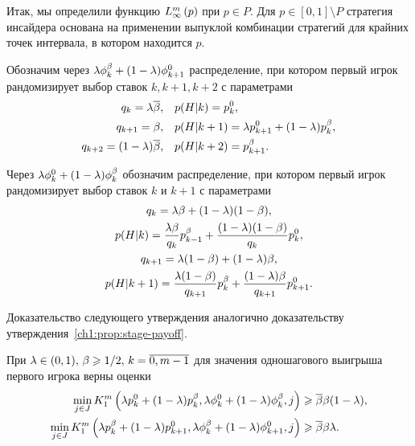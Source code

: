 {Итак, мы определили функцию $\lowerBound{p}$ при $p \in P$.
Для $p \in [0, 1] \setminus P$ стратегия инсайдера основана на применении выпуклой комбинации стратегий для крайних точек интервала, в котором находится $p$.

Обозначим через $\lambda\fOdd[k] + (1-\lambda)\fEven[k+1]$ распределение, при котором первый игрок рандомизирует выбор ставок $k, k+1, k+2$ с параметрами
\begin{align*}
  q_k = \lambda\DCo, &\quad p(H|k) = \pEven,\\
  q_{k+1} = \Co, &\quad p(H|k+1) = \lambda \pEven[k+1] + (1-\lambda) \pOdd,\\
  q_{k+2} = (1-\lambda)\DCo, &\quad p(H|k+2) = \pOdd[k+1].
\end{align*}

Через $\lambda\fEven + (1-\lambda)\fOdd$ обозначим распределение, при котором первый игрок рандомизирует выбор ставок $k$ и $k+1$ с параметрами
\begin{gather*}
  q_k = \lambda\Co + (1-\lambda)(1-\Co), \\
  p(H|k) = \frac{\lambda\Co}{q_k}\pOdd[k-1] + \frac{(1-\lambda)(1-\Co)}{q_k} \pEven,\\
  q_{k+1} = \lambda(1-\Co) + (1-\lambda)\Co, \\
  p(H|k+1) = \frac{\lambda(1-\Co)}{q_{k+1}}\pOdd[k] + \frac{(1-\lambda)\Co}{q_{k+1}}\pEven[k+1].
\end{gather*}

Доказательство следующего утверждения аналогично доказательству утверждения~\ref{ch1:prop:stage-payoff}.
\begin{proposition}
  \label{ch1:prop:first:combination:step}
  При $\lambda \in (0, 1), \, \Co \geq 1/2, \, k = \overline{0, m-1}$ для значения одношагового выигрыша первого игрока верны оценки
  \begin{align*}
    \min_{j \in J}
    \firstPlayerPayoff{1}{%
    \lambda \pEven + (1-\lambda) \pOdd}{%
    \lambda \fEven + (1-\lambda) \fOdd}{%
    j}
    &\geq \DCo \Co (1-\lambda), \\
    \min_{j \in J}
    \firstPlayerPayoff{1}{%
    \lambda \pOdd + (1-\lambda) \pEven[k+1]}{%
    \lambda \fOdd + (1-\lambda) \fEven[k+1]}{%
    j}
    &\geq \DCo \Co \lambda.
  \end{align*}
\end{proposition}

}
